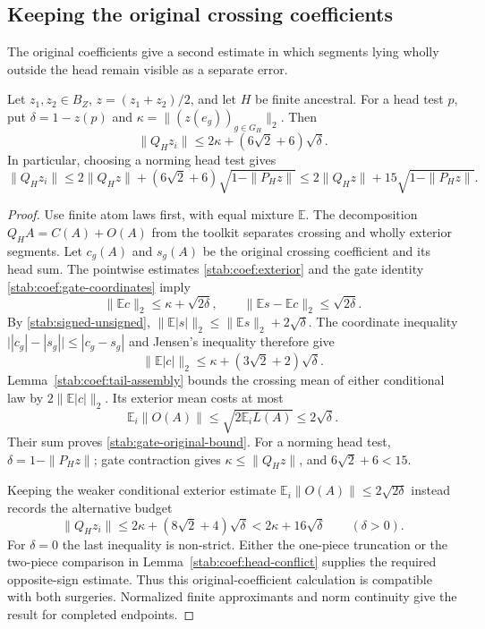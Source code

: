 \subsection{Keeping the original crossing coefficients}

The original coefficients give a second estimate in which segments
lying wholly outside the head remain visible as a separate error.

\begin{proposition}\label{stab:original-crossing}
Let $z_1,z_2\in B_Z$, $z=(z_1+z_2)/2$, and let $H$ be finite
ancestral.  For a head test $p$, put $\delta=1-z(p)$ and
$\kappa=\|(z(e_g))_{g\in G_H}\|_2$.  Then
\begin{equation}\label{stab:gate-original-bound}
 \|Q_Hz_i\|\le2\kappa+(6\sqrt2+6)\sqrt\delta.
\end{equation}
In particular, choosing a norming head test gives
\begin{equation}\label{stab:original-crossing-bound}
 \|Q_Hz_i\|
 \le2\|Q_Hz\|+(6\sqrt2+6)\sqrt{1-\|P_Hz\|}
 \le2\|Q_Hz\|+15\sqrt{1-\|P_Hz\|}.
\end{equation}
\end{proposition}

\begin{proof}
Use finite atom laws first, with equal mixture $\mathbb E$.
The decomposition $Q_HA=C(A)+O(A)$ from the toolkit separates
crossing and wholly exterior segments.  Let $c_g(A)$ and $s_g(A)$
be the original crossing coefficient and its head sum.  The
pointwise estimates \eqref{stab:coef:exterior} and the gate identity
\eqref{stab:coef:gate-coordinates} imply
\[
 \|\mathbb Ec\|_2\le\kappa+\sqrt{2\delta},\qquad
 \|\mathbb Es-\mathbb Ec\|_2\le\sqrt{2\delta}.
\]
By \eqref{stab:signed-unsigned},
$\|\mathbb E|s|\|_2\le\|\mathbb Es\|_2+2\sqrt\delta$.
The coordinate inequality $\big||c_g|-|s_g|\big|\le|c_g-s_g|$
and Jensen's inequality therefore give
\begin{equation}\label{stab:original-mass}
 \|\mathbb E|c|\|_2
 \le\kappa+(3\sqrt2+2)\sqrt\delta.
\end{equation}
Lemma~\ref{stab:coef:tail-assembly} bounds the crossing mean of
either conditional law by $2\|\mathbb E|c|\|_2$.  Its exterior
mean costs at most
\[
 \mathbb E_i\|O(A)\|
 \le\sqrt{2\mathbb E_iL(A)}\le2\sqrt\delta.
\]
Their sum proves \eqref{stab:gate-original-bound}.  For a norming
head test, $\delta=1-\|P_Hz\|$; gate contraction gives
$\kappa\le\|Q_Hz\|$, and $6\sqrt2+6<15$.

Keeping the weaker conditional exterior estimate
$\mathbb E_i\|O(A)\|\le2\sqrt{2\delta}$ instead records the
alternative budget
\begin{equation}\label{stab:sixteen-budget}
 \|Q_Hz_i\|\le2\kappa+(8\sqrt2+4)\sqrt\delta
 <2\kappa+16\sqrt\delta\qquad(\delta>0).
\end{equation}
For $\delta=0$ the last inequality is non-strict.  Either the
one-piece truncation or the two-piece comparison in
Lemma~\ref{stab:coef:head-conflict} supplies the required opposite-sign
estimate.  Thus this original-coefficient calculation is compatible
with both surgeries.  Normalized finite approximants and norm
continuity give the result for completed endpoints.
\end{proof}

